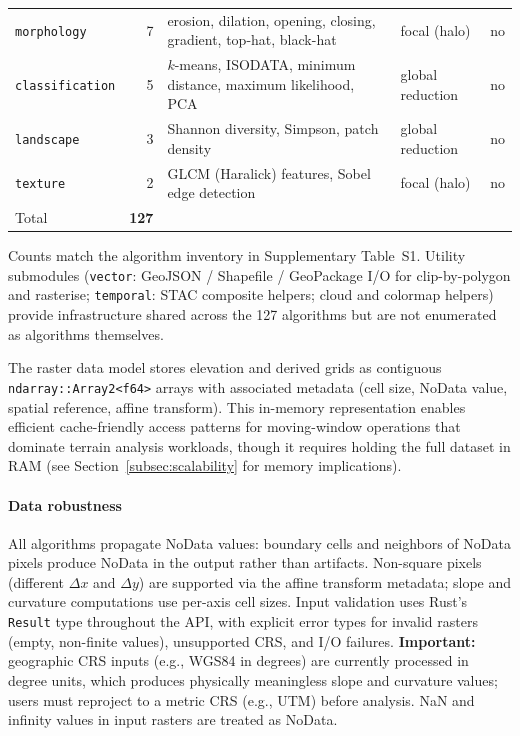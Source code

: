 \documentclass[preprint,review,12pt,authoryear]{elsarticle}
\begin{document}
\begin{table}[htbp]
\begin{tabular}{@{}l r p{4.6cm} l c@{}}
\texttt{morphology}     & 7  & erosion, dilation, opening, closing, gradient, top-hat, black-hat                                                                & focal (halo)           & no  \\
\texttt{classification} & 5  & $k$-means, ISODATA, minimum distance, maximum likelihood, PCA                                                                    & global reduction       & no  \\
\texttt{landscape}      & 3  & Shannon diversity, Simpson, patch density                                                                                        & global reduction       & no  \\
\texttt{texture}        & 2  & GLCM (Haralick) features, Sobel edge detection                                                                                   & focal (halo)           & no  \\
\midrule
Total                  & \textbf{127} &  &  & \\
\bottomrule
\end{tabular}
\smallskip

{\footnotesize Counts match the algorithm inventory in Supplementary Table~S1. Utility submodules (\texttt{vector}: GeoJSON / Shapefile / GeoPackage I/O for clip-by-polygon and rasterise; \texttt{temporal}: STAC composite helpers; cloud and colormap helpers) provide infrastructure shared across the 127 algorithms but are not enumerated as algorithms themselves.}
\end{table}

The raster data model stores elevation and derived grids as contiguous \texttt{ndarray::Array2<f64>} arrays with associated metadata (cell size, NoData value, spatial reference, affine transform). This in-memory representation enables efficient cache-friendly access patterns for moving-window operations that dominate terrain analysis workloads, though it requires holding the full dataset in RAM (see Section~\ref{subsec:scalability} for memory implications).

\paragraph{Data robustness} All algorithms propagate NoData values: boundary cells and neighbors of NoData pixels produce NoData in the output rather than artifacts. Non-square pixels (different $\Delta x$ and $\Delta y$) are supported via the affine transform metadata; slope and curvature computations use per-axis cell sizes. Input validation uses Rust's \texttt{Result} type throughout the API, with explicit error types for invalid rasters (empty, non-finite values), unsupported CRS, and I/O failures. \textbf{Important:} geographic CRS inputs (e.g., WGS84 in degrees) are currently processed in degree units, which produces physically meaningless slope and curvature values; users must reproject to a metric CRS (e.g., UTM) before analysis. NaN and infinity values in input rasters are treated as NoData.
\end{document}
